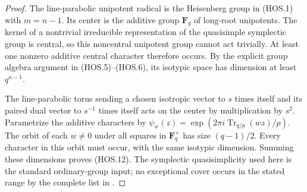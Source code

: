 \begin{proof}
The line-parabolic unipotent radical is the Heisenberg group
in (HOS.1) with $m=n-1$. Its center is the additive group
$\mathbf F_q$ of long-root unipotents. The kernel of a
nontrivial irreducible representation of the quasisimple
symplectic group is central, so this noncentral unipotent
group cannot act trivially. At least one nonzero additive
central character therefore occurs. By the explicit group
algebra argument in (HOS.5)--(HOS.6), its isotypic space
has dimension at least $q^{n-1}$.

The line-parabolic torus sending a chosen isotropic vector
to $s$ times itself and its paired dual vector to $s^{-1}$
times itself acts on the center by multiplication by $s^2$.
Parametrize the additive characters by
$\psi_w(z)=\exp(2\pi i\operatorname{Tr}_{q/p}(wz)/p)$.
The orbit of each $w\ne0$ under all squares in
$\mathbf F_q^\times$ has size $(q-1)/2$. Every character
in this orbit must occur, with the same isotypic dimension.
Summing these dimensions proves (HOS.12). The symplectic
quasisimplicity used here is the standard ordinary-group
input; no exceptional cover occurs in the stated range
by the complete list in \cite[Chapter~5, Table~1, p.~35]{BI:HHM}.
\end{proof}
